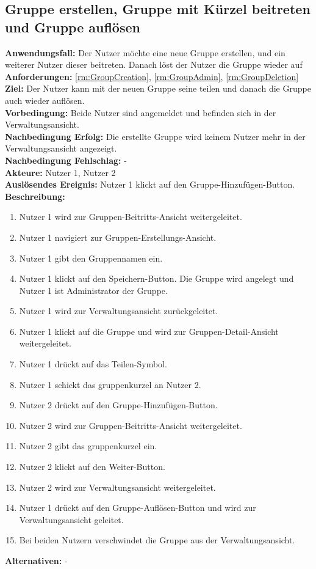 \documentclass[parskip=full]{scrartcl}
\begin{document}
\subsection{Gruppe erstellen, Gruppe mit Kürzel beitreten und Gruppe auflösen}
\textbf{Anwendungsfall:} Der Nutzer möchte eine neue Gruppe erstellen, und ein weiterer Nutzer dieser beitreten. Danach löst der Nutzer die Gruppe wieder auf\\
\textbf{Anforderungen:} \ref{rm:GroupCreation}, \ref{rm:GroupAdmin}, \ref{rm:GroupDeletion} \\
\textbf{Ziel:} Der Nutzer kann mit der neuen Gruppe seine  teilen und danach die Gruppe auch wieder auflösen.\\
\textbf{Vorbedingung:} Beide Nutzer sind angemeldet und befinden sich in der Verwaltungsansicht.\\
\textbf{Nachbedingung Erfolg:} Die erstellte Gruppe wird keinem Nutzer mehr in der Verwaltungsansicht angezeigt.\\
\textbf{Nachbedingung Fehlschlag:} -\\
\textbf{Akteure:} Nutzer 1, Nutzer 2\\
\textbf{Auslösendes Ereignis:} Nutzer 1 klickt auf den Gruppe-Hinzufügen-Button.\\
\textbf{Beschreibung:}
\begin{enumerate}
    \item Nutzer 1 wird zur Gruppen-Beitritts-Ansicht weitergeleitet.
    \item Nutzer 1 navigiert zur Gruppen-Erstellungs-Ansicht.
    \item Nutzer 1 gibt den Gruppennamen ein.
    \item Nutzer 1 klickt auf den Speichern-Button. Die Gruppe wird angelegt und Nutzer 1 ist Administrator der Gruppe.
    \item Nutzer 1 wird zur Verwaltungsansicht zurückgeleitet.
    \item Nutzer 1 klickt auf die Gruppe und wird zur Gruppen-Detail-Ansicht weitergeleitet.
    \item Nutzer 1 drückt auf das Teilen-Symbol.
    \item Nutzer 1 schickt das \gls{gruppenkurzel} an Nutzer 2.
    \item Nutzer 2 drückt auf den Gruppe-Hinzufügen-Button.
    \item Nutzer 2 wird zur Gruppen-Beitritts-Ansicht weitergeleitet.
    \item Nutzer 2 gibt das \gls{gruppenkurzel} ein.
    \item Nutzer 2 klickt auf den Weiter-Button.
    \item Nutzer 2 wird zur Verwaltungsansicht weitergeleitet.
    \item Nutzer 1 drückt auf den Gruppe-Auflösen-Button und wird zur Verwaltungsansicht geleitet.
    \item Bei beiden Nutzern verschwindet die Gruppe aus der Verwaltungsansicht.
\end{enumerate}
\textbf{Alternativen:} -
\newpage
\end{document}
